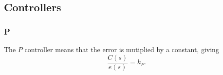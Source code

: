 \subsection{Controllers}
\subsubsection{P}
The $P$ controller means that the error is mutiplied by a constant, giving
\begin{equation}
    \frac{C(s)}{e(s)} = k_P.
\end{equation}